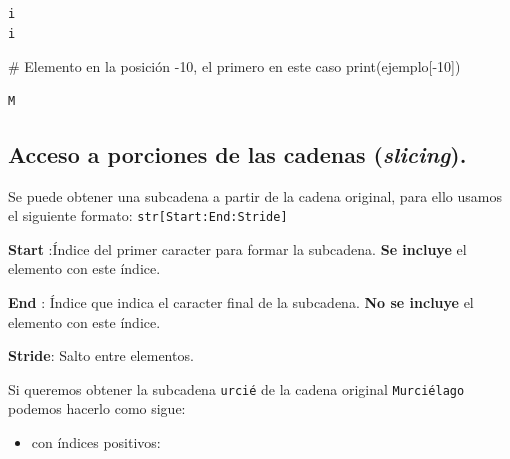 \documentclass[
  spanish,
  letterpaper,
]{scrbook}
\newenvironment{Shaded}{\begin{snugshade}}{\end{snugshade}}
\newcommand{\BuiltInTok}[1]{\textcolor[rgb]{0.00,0.23,0.31}{#1}}
\newcommand{\CommentTok}[1]{\textcolor[rgb]{0.37,0.37,0.37}{#1}}
\newcommand{\DecValTok}[1]{\textcolor[rgb]{0.68,0.00,0.00}{#1}}
\newcommand{\NormalTok}[1]{\textcolor[rgb]{0.00,0.23,0.31}{#1}}
\newcommand{\OperatorTok}[1]{\textcolor[rgb]{0.37,0.37,0.37}{#1}}
\providecommand{\tightlist}{%
  \setlength{\itemsep}{0pt}\setlength{\parskip}{0pt}}
\theoremstyle{definition}
\theoremstyle{remark}
\begin{document}
\begin{verbatim}
i
i
\end{verbatim}

\begin{Shaded}
\begin{Highlighting}[]
\CommentTok{\# Elemento en la posición {-}10, el primero en este caso}
\BuiltInTok{print}\NormalTok{(ejemplo[}\OperatorTok{{-}}\DecValTok{10}\NormalTok{]) }
\end{Highlighting}
\end{Shaded}

\begin{verbatim}
M
\end{verbatim}

\subsection{\texorpdfstring{Acceso a porciones de las cadenas
(\emph{slicing}).}{Acceso a porciones de las cadenas (slicing).}}\label{sec-e-slicing}

Se puede obtener una subcadena a partir de la cadena original, para ello
usamos el siguiente formato: \texttt{str{[}Start:End:Stride{]}}

\textbf{Start} :Índice del primer caracter para formar la subcadena.
\textbf{Se incluye} el elemento con este índice.

\textbf{End} : Índice que indica el caracter final de la subcadena.
\textbf{No se incluye} el elemento con este índice.

\textbf{Stride}: Salto entre elementos.

Si queremos obtener la subcadena \texttt{urcié} de la cadena original
\texttt{Murciélago} podemos hacerlo como sigue:

\begin{itemize}
\tightlist
\item
  con índices positivos:
\end{itemize}
\end{document}
